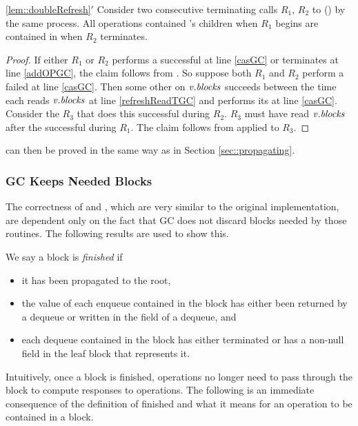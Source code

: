 \begin{customlemma}{\ref{lem::doubleRefresh}$'$}\label{lem::doubleRefreshGC}
Consider two consecutive terminating calls $R_1$, $R_2$ to () by the same process.
All operations contained 's children when $R_1$ begins
are contained in  when $R_2$ terminates.
\end{customlemma}
\begin{proof}
If either $R_1$ or $R_2$ performs a successful  at line \ref{casGC} or terminates at line \ref{addOPGC}, the claim follows
from .
So suppose both $R_1$ and $R_2$ perform a failed  at line \ref{casGC}.
Then some other  on $\mbox{\textnormal{\textit{v}}}.\mbox{\textit{blocks}}$ succeeds between the time each 
reads $\mbox{\textnormal{\textit{v}}}.\mbox{\textit{blocks}}$ at line \ref{refreshReadTGC} and performs its  at line \ref{casGC}.
Consider the  $R_3$ that does this successful  during $R_2$.
$R_3$ must have read $\mbox{\textnormal{\textit{v}}}.\mbox{\textit{blocks}}$ after the successful  during $R_1$.
The claim follows from  applied to $R_3$.
\end{proof}

 can then be proved in the same way as in Section \ref{sec::propagating}.


\subsubsection{GC Keeps Needed Blocks}

The correctness of  and , which are very similar to the 
original implementation, are dependent only on the fact that GC does not 
discard blocks needed by those routines.
The following results are used to show this.

We say a block is \emph{finished} if 
\begin{itemize}
\item
it has been propagated to the root,
\item
the value of each enqueue contained in the block has either been returned by a dequeue
or written in the  field of a dequeue, and
\item
each dequeue contained in the block has either terminated or has a non-null  field in the leaf block that represents it.
\end{itemize}
Intuitively, once a block is finished, operations no longer need to pass through the block
to compute responses to operations.
The following is an immediate consequence of the definition of finished and what it means for an operation to be contained in a block.

